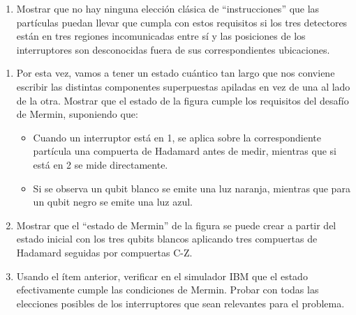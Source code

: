 \documentclass[a4paper,11pt,spanish]{article}
\begin{document}
\begin{enumerate}
    \begin{enumerate}
     \item Mostrar que no hay ninguna elecci\'on cl\'asica de ``instrucciones'' que las part\'iculas puedan llevar que cumpla con estos requisitos si los tres detectores est\'an en tres regiones incomunicadas entre s\'i y las posiciones de los interruptores son desconocidas fuera de sus correspondientes ubicaciones.
    \end{enumerate}

    \begin{minipage}{280pt}
     \begin{enumerate}
      \item[(b)] Por esta vez, vamos a tener un estado cu\'antico tan largo que nos conviene escribir las distintas componentes superpuestas apiladas en vez de una al lado de la otra. Mostrar que el estado de la figura cumple los requisitos del desaf\'io de Mermin, suponiendo que:
     \begin{itemize}
      \item Cuando un interruptor est\'a en 1, se aplica sobre la correspondiente part\'icula una compuerta de Hadamard antes de medir, mientras que si est\'a en 2 se mide directamente.
      \item Si se observa un qubit blanco se emite una luz naranja, mientras que para un qubit negro se emite una luz azul.
     \end{itemize}

     \item[(c)] Mostrar que el ``estado de Mermin'' de la figura se puede crear a partir del estado inicial con los tres qubits blancos aplicando tres compuertas de Hadamard seguidas por compuertas C-Z.

     \item[(d)] Usando el \'item anterior, verificar en el simulador IBM que el estado efectivamente cumple las condiciones de Mermin. Probar con todas las elecciones posibles de los interruptores que sean relevantes para el problema.



\end{enumerate}
\end{minipage}
\end{enumerate}
\end{document}
